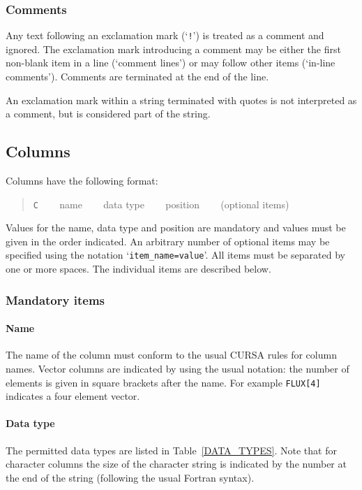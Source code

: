 \documentclass[twoside,11pt]{starlink}
\begin{document}
\subsubsection{Comments}

Any text following an exclamation mark (`\texttt{!}') is treated as a
comment and ignored.  The exclamation mark introducing a comment may
be either the first non-blank item in a line (`comment lines') or
may follow other items (`in-line comments').  Comments are terminated
at the end of the line.

An exclamation mark within a string terminated with quotes is not
interpreted as a comment, but is considered part of the string.


\subsection{Columns \label{COL}}

Columns have the following format:

\begin{quote}
\texttt{C} ~~~ name ~~~ data type ~~~ position ~~~ (optional items)
\end{quote}

Values for the name, data type and position are mandatory and values
must be given in the order indicated.  An arbitrary number of optional
items may be specified using the notation `\texttt{item\_name=value}'.
All items must be separated by one or more spaces.  The individual
items are described below.

\subsubsection{Mandatory items}

\paragraph{Name}  The name of the column must conform to the usual
CURSA rules for column names.  Vector columns are indicated by using
the usual notation: the number of elements is given in square brackets
after the name.  For example \texttt{FLUX[4]} indicates a four element
vector.

\paragraph{Data type}  The permitted data types are listed in
Table~\ref{DATA_TYPES}.  Note that for character columns the size of
the character string is indicated by the number at the end of the string
(following the usual Fortran syntax).
\end{document}
